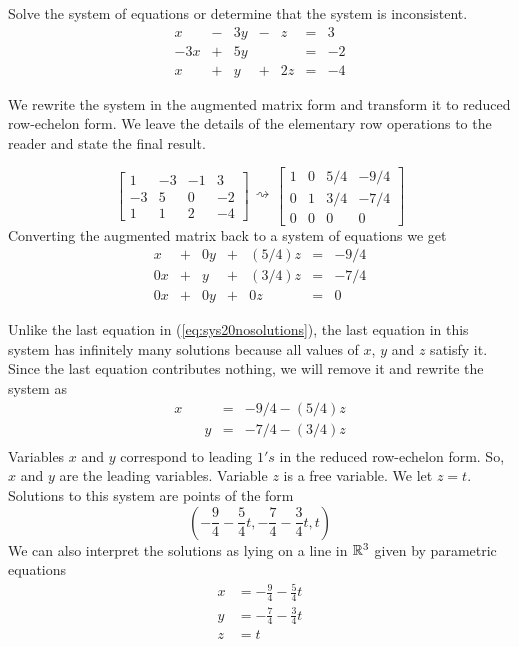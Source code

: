 \documentclass{ximera}
\begin{document}
\begin{example}\label{ex:rrefinfmanysolutionssys}
Solve the system of equations or determine that the system is inconsistent.
$$\begin{array}{ccccccc}
      x & -&3y&-&z&= &3 \\
     -3x& +&5y&&&=&-2\\
     x&+ &y&+&2z&=&-4
    \end{array}$$
     
    \begin{explanation}
    We rewrite the system in the augmented matrix form and transform it to reduced row-echelon form.  We leave the details of the elementary row operations to the reader and state the final result.
     
   $$ \left[\begin{array}{ccc|c} 
 1&-3&-1&3\\-3&5&0&-2\\1&1&2&-4
 \end{array}\right]\begin{array}{c}
 \\
 \rightsquigarrow\\
 \\
 \end{array}\left[\begin{array}{ccc|c} 
 1&0&5/4&-9/4\\0&1&3/4&-7/4\\0&0&0&0
 \end{array}\right]$$
 Converting the augmented matrix back to a system of equations we get
 $$\begin{array}{ccccccc}
      x &+ &0y&+&(5/4)z&= &-9/4 \\
     0x& +&y&+&(3/4)z&=&-7/4\\
     0x&+ &0y&+&0z&=&0
    \end{array}$$
     
 Unlike the last equation in (\ref{eq:sys20nosolutions}), the last equation in this system has infinitely many solutions because all values of $x$, $y$ and $z$ satisfy it.  Since the last equation contributes nothing, we will remove it and rewrite the system as
 $$\begin{array}{ccccc}
      x & &&= &-9/4-(5/4)z \\
     & &y&=&-7/4-(3/4)z\\
    \end{array}$$
Variables $x$ and $y$ correspond to leading $1's$ in the reduced row-echelon form.  So, $x$ and $y$ are the leading variables.    Variable $z$ is a free variable.  We let $z=t$.  Solutions to this system are points of the form
  $$\left(-\frac{9}{4}-\frac{5}{4}t, -\frac{7}{4}-\frac{3}{4}t, t\right)$$
  We can also interpret the solutions as lying on a line in $\mathbb{R}^3$ given by parametric equations
  \begin{align*}
  x&=-\frac{9}{4}-\frac{5}{4}t\\
  y&=-\frac{7}{4}-\frac{3}{4}t\\
  z&=t\\
  \end{align*}
   

\end{explanation}
\end{example}
\end{document}
